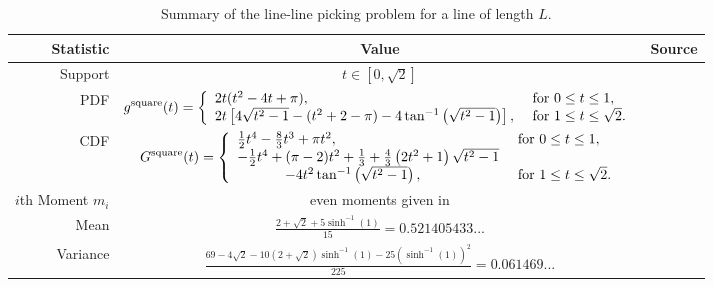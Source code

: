 \begin{table}[ht]
  \centering
  \begin{tabular}{|r|c|l|}
    \hline
    Statistic & Value & Source \\ 
    \hline
      Support            & $t \in [0, \sqrt{2}]$ & \\
      PDF                & $\displaystyle 
  g^{\rm square}(t) = \left\{ \begin{array}{ll}
      2t (t^2-4t+\pi),
               & \mbox{ for } 0 \leq t \leq 1, \\
      2t \left[4 \sqrt{t^2-1} - (t^2+2-\pi) - 4 \tan^{-1} \left(\sqrt{t^2-1} \right)\right], 
               & \mbox{ for } 1 \leq t \leq \sqrt{2} . \\ 
    \end{array} \right.
                                 $ &
                             \cite{philip:_probab_distr_distan_between_two,weisstein:_squar_line_picking} \\
      CDF                & $\displaystyle
  G^{\rm square}(t) = \left\{ \begin{array}{ll}
      \frac{1}{2} t^4 - \frac{8}{3} t^3 + \pi t^2, 
               & \mbox{ for } 0 \leq t \leq 1, \\
      -\frac{1}{2} t^4 + (\pi-2)t^2 + \frac{1}{3}
                   +\frac{4}{3} \left( 2t^2+1 \right)\sqrt{t^2-1} 
                     & \\
                   \hspace{12mm} - 4 t^2 \tan^{-1} \left(\sqrt{t^2-1} \right),
               & \mbox{ for } 1 \leq t \leq \sqrt{2} . \\ 
    \end{array} \right.
                                 $ & 
                             \cite{weisstein:_squar_line_picking} \\
      $i$th Moment $m_i$ & even moments given in\cite{weisstein:_squar_line_picking} &
                              \cite{weisstein:_squar_line_picking} \\
      Mean               & $\displaystyle \frac{2 + \sqrt{2} + 5\sinh^{-1}(1)}{15}
                             = 0.521405433...$ &
                             \cite{weisstein:_squar_line_picking,Bailey2007196} \\[1.5ex]
      Variance           & $\displaystyle \frac{69 - 4\sqrt{2} -
                             10(2+\sqrt{2}) \sinh^{-1}(1)
                             -25(\sinh^{-1}(1) )^2
                            }{225}
                             = 0.061469...$ &
                             \cite{weisstein:_squar_line_picking} \\[1.5ex]
    \hline
  \end{tabular}
  \caption{Summary of the line-line picking problem for a line of
    length $L$.}
  \label{tab:summary_line}
\end{table}

